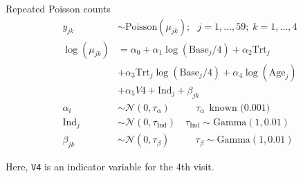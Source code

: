 \documentclass[
  ignorenonframetext,
]{beamer}
\begin{document}
\begin{frame}[fragile]{Repeated Poisson counts}
\protect\hypertarget{repeated-poisson-counts-1}{}
\[
\begin{aligned}
  y_{jk} & \sim  \text{Poisson}(\mu_{jk});\mbox{  }
        j=1,\dots,59;\; k=1,\dots,4\\
  \log(\mu_{jk})  &= \alpha_0 + \alpha_1
        \log(\text{Base}_j / 4) + \alpha_2\text{Trt}_j\\
    &+ \alpha_3\text{Trt}_j \log(\text{Base}_j / 4) +
        \alpha_4\log(\text{Age}_j) \\
        &+ \alpha_5 V4 + \text{Ind}_j + \beta_{jk}\\
        \alpha_i & \sim  \mathcal{N}(0, \tau_{\alpha})\mbox{   }
        \qquad\tau_{\alpha}\ \  \text{known (0.001)}\\
        \text{Ind}_j & \sim  \mathcal{N}(0, \tau_{\text{Ind}})\quad\tau_{\text{Ind}}\sim\text{Gamma}(1, 0.01)\\
        \beta_{jk} & \sim  \mathcal{N}(0, \tau_{\beta})\mbox{   }
        \qquad\tau_{\beta}\sim\text{Gamma}(1, 0.01)
\end{aligned}
\]

Here, \texttt{V4} is an indicator variable for the 4th visit.
\end{frame}
\end{document}
